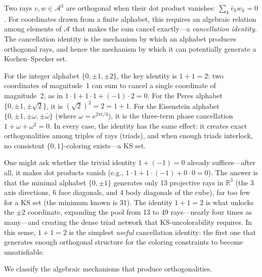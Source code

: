 \documentclass[12pt,a4paper]{article}
\newcommand{\R}{\mathbb{R}}
\begin{document}
Two rays $v, w \in \mathcal{A}^3$ are orthogonal when their dot product vanishes: $\sum_k \bar v_k w_k = 0$.  For coordinates drawn from a finite alphabet, this requires an algebraic relation among elements of $\mathcal{A}$ that makes the sum cancel exactly---a \emph{cancellation identity}.  The cancellation identity is the mechanism by which an alphabet produces orthogonal rays, and hence the mechanism by which it can potentially generate a Kochen--Specker set.

For the integer alphabet $\{0, \pm 1, \pm 2\}$, the key identity is $1 + 1 = 2$: two coordinates of magnitude~1 can sum to cancel a single coordinate of magnitude~2, as in $1 \cdot 1 + 1 \cdot 1 + (-1) \cdot 2 = 0$.  For the Peres alphabet $\{0, \pm 1, \pm\sqrt{2}\}$, it is $(\sqrt{2})^2 = 2 = 1 + 1$.  For the Eisenstein alphabet $\{0, \pm 1, \pm\omega, \pm\bar\omega\}$ (where $\omega = e^{2\pi i/3}$), it is the three-term phase cancellation $1 + \omega + \omega^2 = 0$.  In every case, the identity has the same effect: it creates exact orthogonalities among triples of rays (triads), and when enough triads interlock, no consistent $\{0,1\}$-coloring exists---a KS set.

One might ask whether the trivial identity $1 + (-1) = 0$ already suffices---after all, it makes dot products vanish (e.g., $1 \cdot 1 + 1 \cdot (-1) + 0 \cdot 0 = 0$).  The answer is that the minimal alphabet $\{0, \pm 1\}$ generates only 13 projective rays in $\R^3$ (the 3 axis directions, 6 face diagonals, and 4 body diagonals of the cube), far too few for a KS set (the minimum known is 31).  The identity $1 + 1 = 2$ is what unlocks the $\pm 2$ coordinate, expanding the pool from 13 to 49 rays---nearly four times as many---and creating the dense triad network that KS-uncolorability requires.  In this sense, $1 + 1 = 2$ is the simplest \emph{useful} cancellation identity: the first one that generates enough orthogonal structure for the coloring constraints to become unsatisfiable.

We classify the algebraic mechanisms that produce orthogonalities.
\end{document}
